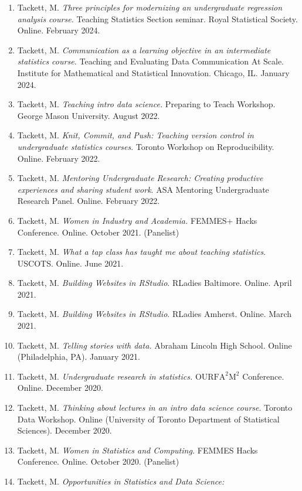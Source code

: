 \documentclass[11pt,dvipsnames]{article}
\begin{document}
\begin{enumerate}
\def\labelenumi{\arabic{enumi}.}
\item
  Tackett, M. \emph{Three principles for modernizing an undergraduate
  regression analysis course.} Teaching Statistics Section seminar.
  Royal Statistical Society. Online. February 2024.
\item
  Tackett, M. \emph{Communication as a learning objective in an
  intermediate statistics course.} Teaching and Evaluating Data
  Communication At Scale. Institute for Mathematical and Statistical
  Innovation. Chicago, IL. January 2024.
\item
  Tackett, M. \emph{Teaching intro data science.} Preparing to Teach
  Workshop. George Mason University. August 2022.
\item
  Tackett, M. \emph{Knit, Commit, and Push: Teaching version control in
  undergraduate statistics courses}. Toronto Workshop on
  Reproducibility. Online. February 2022.
\item
  Tackett, M. \emph{Mentoring Undergraduate Research: Creating
  productive experiences and sharing student work}. ASA Mentoring
  Undergraduate Research Panel. Online. February 2022.
\item
  Tackett, M. \emph{Women in Industry and Academia.} FEMMES+ Hacks
  Conference. Online. October 2021. (Panelist)
\item
  Tackett, M. \emph{What a tap class has taught me about teaching
  statistics}. USCOTS. Online. June 2021.
\item
  Tackett, M. \emph{Building Websites in RStudio}. RLadies Baltimore.
  Online. April 2021.
\item
  Tackett, M. \emph{Building Websites in RStudio}. RLadies Amherst.
  Online. March 2021.
\item
  Tackett, M. \emph{Telling stories with data.} Abraham Lincoln High
  School. Online (Philadelphia, PA). January 2021.
\item
  Tackett, M. \emph{Undergraduate research in statistics.}
  \(\text{OURFA}^2\text{M}^2\) Conference. Online. December 2020.
\item
  Tackett, M. \emph{Thinking about lectures in an intro data science
  course}. Toronto Data Workshop. Online (University of Toronto
  Department of Statistical Sciences). December 2020.
\item
  Tackett, M. \emph{Women in Statistics and Computing.} FEMMES Hacks
  Conference. Online. October 2020. (Panelist)
\item
  Tackett, M. \emph{Opportunities in Statistics and Data Science:
}
\end{enumerate}
\end{document}
